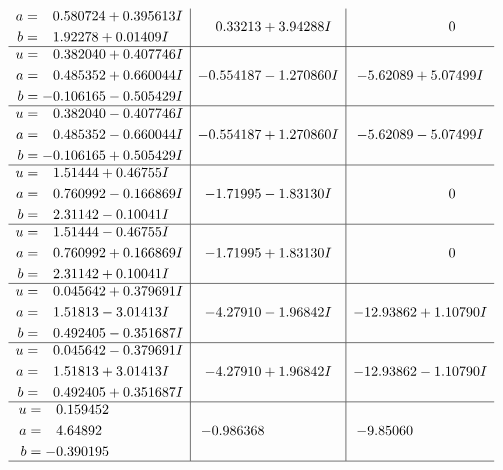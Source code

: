 \documentclass[1p]{elsarticle_modified}
\theoremstyle{definition}
\begin{document}
$$\begin{array}{c|c|c}
\begin{aligned}
a &= \phantom{-}0.580724 + 0.395613 I \\
b &= \phantom{-}1.92278 + 0.01409 I\end{aligned}
 & \phantom{-}0.33213 + 3.94288 I & \phantom{-0.000000 } 0 \\ \hline\begin{aligned}
u &= \phantom{-}0.382040 + 0.407746 I \\
a &= \phantom{-}0.485352 + 0.660044 I \\
b &= -0.106165 - 0.505429 I\end{aligned}
 & -0.554187 - 1.270860 I & -5.62089 + 5.07499 I \\ \hline\begin{aligned}
u &= \phantom{-}0.382040 - 0.407746 I \\
a &= \phantom{-}0.485352 - 0.660044 I \\
b &= -0.106165 + 0.505429 I\end{aligned}
 & -0.554187 + 1.270860 I & -5.62089 - 5.07499 I \\ \hline\begin{aligned}
u &= \phantom{-}1.51444 + 0.46755 I \\
a &= \phantom{-}0.760992 - 0.166869 I \\
b &= \phantom{-}2.31142 - 0.10041 I\end{aligned}
 & -1.71995 - 1.83130 I & \phantom{-0.000000 } 0 \\ \hline\begin{aligned}
u &= \phantom{-}1.51444 - 0.46755 I \\
a &= \phantom{-}0.760992 + 0.166869 I \\
b &= \phantom{-}2.31142 + 0.10041 I\end{aligned}
 & -1.71995 + 1.83130 I & \phantom{-0.000000 } 0 \\ \hline\begin{aligned}
u &= \phantom{-}0.045642 + 0.379691 I \\
a &= \phantom{-}1.51813 - 3.01413 I \\
b &= \phantom{-}0.492405 - 0.351687 I\end{aligned}
 & -4.27910 - 1.96842 I & -12.93862 + 1.10790 I \\ \hline\begin{aligned}
u &= \phantom{-}0.045642 - 0.379691 I \\
a &= \phantom{-}1.51813 + 3.01413 I \\
b &= \phantom{-}0.492405 + 0.351687 I\end{aligned}
 & -4.27910 + 1.96842 I & -12.93862 - 1.10790 I \\ \hline\begin{aligned}
u &= \phantom{-}0.159452\phantom{ +0.000000I} \\
a &= \phantom{-}4.64892\phantom{ +0.000000I} \\
b &= -0.390195\phantom{ +0.000000I}\end{aligned}
 & -0.986368\phantom{ +0.000000I} & -9.85060\phantom{ +0.000000I}\\
 \hline 
 \end{array}$$\newpage\newpage\renewcommand{\arraystretch}{1}
\end{document}
